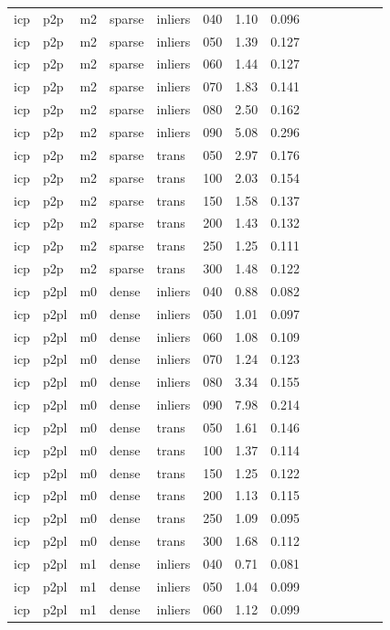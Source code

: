 \begin{table}[htbp]
\begin{tabular}{llllllrrrrrrrr}
  icp & p2p & m2 & sparse & inliers & 040 & 1.10 & 0.096 \\
  icp & p2p & m2 & sparse & inliers & 050 & 1.39 & 0.127 \\
  icp & p2p & m2 & sparse & inliers & 060 & 1.44 & 0.127 \\
  icp & p2p & m2 & sparse & inliers & 070 & 1.83 & 0.141 \\
  icp & p2p & m2 & sparse & inliers & 080 & 2.50 & 0.162 \\
  icp & p2p & m2 & sparse & inliers & 090 & 5.08 & 0.296 \\
  icp & p2p & m2 & sparse & trans & 050 & 2.97 & 0.176 \\
  icp & p2p & m2 & sparse & trans & 100 & 2.03 & 0.154 \\
  icp & p2p & m2 & sparse & trans & 150 & 1.58 & 0.137 \\
  icp & p2p & m2 & sparse & trans & 200 & 1.43 & 0.132 \\
  icp & p2p & m2 & sparse & trans & 250 & 1.25 & 0.111 \\
  icp & p2p & m2 & sparse & trans & 300 & 1.48 & 0.122 \\
  icp & p2pl & m0 & dense & inliers & 040 & 0.88 & 0.082 \\
  icp & p2pl & m0 & dense & inliers & 050 & 1.01 & 0.097 \\
  icp & p2pl & m0 & dense & inliers & 060 & 1.08 & 0.109 \\
  icp & p2pl & m0 & dense & inliers & 070 & 1.24 & 0.123 \\
  icp & p2pl & m0 & dense & inliers & 080 & 3.34 & 0.155 \\
  icp & p2pl & m0 & dense & inliers & 090 & 7.98 & 0.214 \\
  icp & p2pl & m0 & dense & trans & 050 & 1.61 & 0.146 \\
  icp & p2pl & m0 & dense & trans & 100 & 1.37 & 0.114 \\
  icp & p2pl & m0 & dense & trans & 150 & 1.25 & 0.122 \\
  icp & p2pl & m0 & dense & trans & 200 & 1.13 & 0.115 \\
  icp & p2pl & m0 & dense & trans & 250 & 1.09 & 0.095 \\
  icp & p2pl & m0 & dense & trans & 300 & 1.68 & 0.112 \\
  icp & p2pl & m1 & dense & inliers & 040 & 0.71 & 0.081 \\
  icp & p2pl & m1 & dense & inliers & 050 & 1.04 & 0.099 \\
  icp & p2pl & m1 & dense & inliers & 060 & 1.12 & 0.099 \\

\end{tabular}
\end{table}
